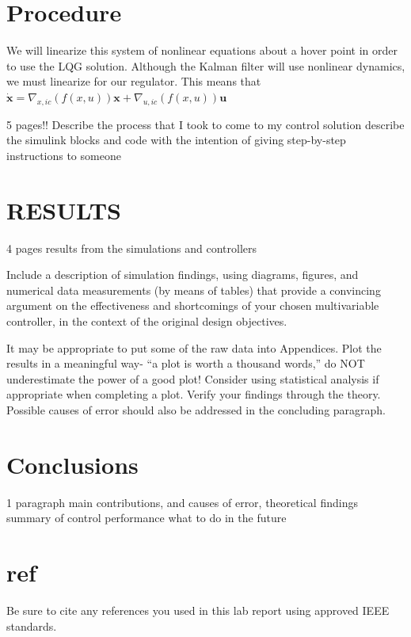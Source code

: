 \documentclass[conf]{new-aiaa}
\begin{document}
\begin{doublespace}
\section{Procedure}

We will linearize this system of nonlinear equations about a hover point in order to use the LQG solution. Although the Kalman filter will use nonlinear dynamics, we must linearize for our regulator. This means that $\dot{\mathbf{x}} = \nabla_{x,ic}(f(x,u))\mathbf{x} + \nabla_{u,ic}(f(x,u))\mathbf{u}$

5 pages!!
Describe the process  that I took to come to my control solution
describe the simulink blocks and code
with the intention of giving step-by-step instructions to someone

\section{RESULTS}
4 pages
results from the simulations and controllers

Include a description of simulation findings, using diagrams, figures, and numerical data measurements (by means of tables) that provide a convincing argument on the effectiveness and shortcomings of
your chosen multivariable controller, in the context of the original design objectives. 

It may be appropriate to put some of the raw data into Appendices. Plot the results in a meaningful way- “a plot is worth a thousand words,” do NOT underestimate the power of a good plot! Consider using statistical analysis if appropriate when completing a plot. Verify your findings through the theory. Possible causes of error should also be addressed in the concluding paragraph.


\section{Conclusions}
1 paragraph
main contributions, and causes of error, theoretical findings
summary of control performance
what to do in the future

\section{ref}
Be sure to cite any references you used in this lab report using approved IEEE standards. 





\end{doublespace}

\end{document}

